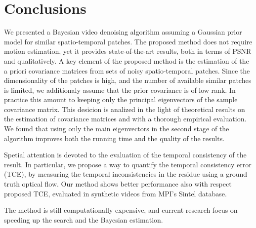 \documentclass[10pt, journal, twocolumn, final, a4paper]{IEEEtran}
\begin{document}
\section{Conclusions}
\label{sec:conclusion}

We presented a Bayesian video denoising algorithm assuming a Gaussian prior
model for similar spatio-temporal patches. 
The proposed method does not require motion estimation, yet it provides 
state-of-the-art results, both in terms of PSNR and qualitatively. 
A key element of the proposed method is the estimation of the a priori
covariance matrices from sets of noisy spatio-temporal patches. Since
the dimensionality of the patches is high, and the number of available 
similar patches is limited, we additionaly assume that the prior covariance
is of low rank. In practice this amount to keeping only the principal 
eigenvectors of the sample covariance matrix. This desicion is analized
in the light of theoretical results on the estimation of covariance matrices 
and with a thorough empirical evaluation. We found that using only the 
main eigenvectors in the second stage of the algorithm improves both
the running time and the quality of the results.

Spetial attention is devoted to the evaluation of the temporal consistency of
the result. In particular, we propose a way to quantify the temporal
consistency error (TCE), by measuring the temporal inconsistencies in the
residue using a ground truth optical flow. Our method shows better performance
also with respect proposed TCE, evaluated in synthetic videos from MPI's Sintel
database.

The method is still computationally expensive, and current research focus
on speeding up the search and the Bayesian estimation.

%
%



\end{document}
